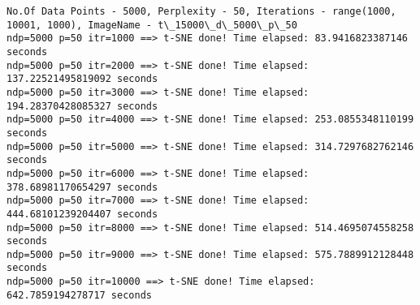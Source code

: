 \documentclass[11pt]{article}
\begin{document}
    \begin{Verbatim}[commandchars=\\\{\}]
No.Of Data Points - 5000, Perplexity - 50, Iterations - range(1000, 10001, 1000), ImageName - t\_15000\_d\_5000\_p\_50
ndp=5000 p=50 itr=1000 ==> t-SNE done! Time elapsed: 83.9416823387146 seconds
ndp=5000 p=50 itr=2000 ==> t-SNE done! Time elapsed: 137.22521495819092 seconds
ndp=5000 p=50 itr=3000 ==> t-SNE done! Time elapsed: 194.28370428085327 seconds
ndp=5000 p=50 itr=4000 ==> t-SNE done! Time elapsed: 253.0855348110199 seconds
ndp=5000 p=50 itr=5000 ==> t-SNE done! Time elapsed: 314.7297682762146 seconds
ndp=5000 p=50 itr=6000 ==> t-SNE done! Time elapsed: 378.68981170654297 seconds
ndp=5000 p=50 itr=7000 ==> t-SNE done! Time elapsed: 444.68101239204407 seconds
ndp=5000 p=50 itr=8000 ==> t-SNE done! Time elapsed: 514.4695074558258 seconds
ndp=5000 p=50 itr=9000 ==> t-SNE done! Time elapsed: 575.7889912128448 seconds
ndp=5000 p=50 itr=10000 ==> t-SNE done! Time elapsed: 642.7859194278717 seconds

    \end{Verbatim}

    \begin{center}
    \end{center}
    { \hspace*{\fill} \\}
    
    \begin{center}
    \end{center}
    { \hspace*{\fill} \\}
    
    \begin{center}
    \end{center}
    { \hspace*{\fill} \\}
    
    \begin{center}
    \end{center}
    { \hspace*{\fill} \\}
    
    \begin{center}
    \end{center}
    { \hspace*{\fill} \\}
    
\end{document}
